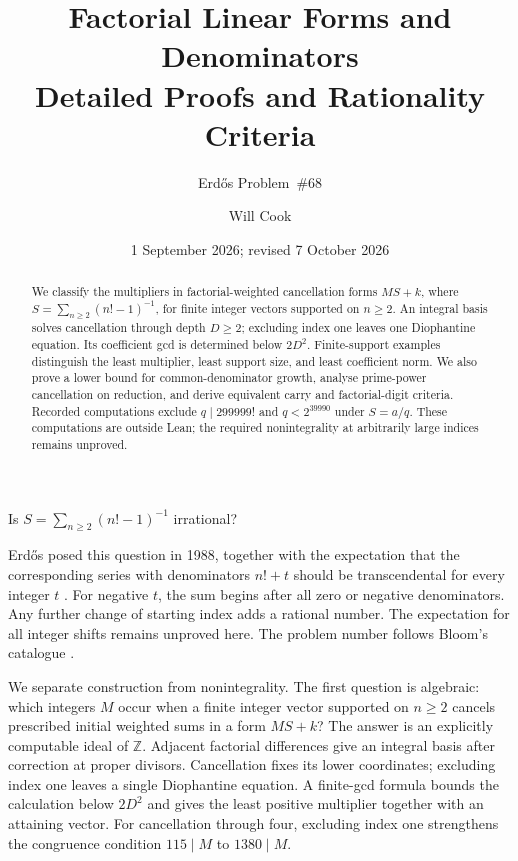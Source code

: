 \documentclass[11pt]{article}
\title{Factorial Linear Forms and Denominators\\Detailed Proofs and Rationality Criteria}
\subtitle{Erd\H{o}s Problem~\#68}
\author{Will Cook}
\date{1 September 2026; revised 7 October 2026}
\newcommand{\Ser}{S}
\begin{document}
\maketitle
\noteprovenance

\begin{abstract}
We classify the multipliers in factorial-weighted cancellation forms
$MS+k$, where $S=\sum_{n\ge2}(n!-1)^{-1}$, for finite integer vectors
supported on $n\ge2$. An integral basis solves cancellation through
depth $D\ge2$; excluding index one leaves one Diophantine equation.
Its coefficient gcd is determined below $2D^2$. Finite-support examples distinguish the least
multiplier, least support size, and least coefficient norm. We also prove a lower
bound for common-denominator growth, analyse prime-power cancellation
on reduction, and derive equivalent carry and factorial-digit criteria.
Recorded computations exclude $q\mid299999!$ and $q<2^{39990}$ under
$S=a/q$. These computations are outside Lean; the required nonintegrality
at arbitrarily large indices remains unproved.
\end{abstract}

\begin{problem}[Erd\H{o}s \#68]\label{long68:res:problem}
Is $\Ser=\sum_{n\ge2}(n!-1)^{-1}$ irrational?
\end{problem}

Erd\H{o}s posed this question in 1988, together with the expectation that
the corresponding series with denominators $n!+t$ should be
transcendental for every integer $t$ \cite[p.~102]{erdos1988}.
For negative $t$, the sum begins after all zero or negative denominators.
Any further change of starting index adds a rational number. The
expectation for all integer shifts remains unproved here.
The problem number follows Bloom's catalogue \cite{bloom}.

We separate construction from nonintegrality. The first question is
algebraic: which integers $M$ occur when a finite integer vector
supported on $n\ge2$ cancels prescribed initial weighted sums in a form
$MS+k$? The answer is an explicitly computable ideal of $\mathbb Z$.
Adjacent factorial differences give an integral basis after correction
at proper divisors. Cancellation fixes its lower coordinates;
excluding index one leaves a single Diophantine equation. A finite-gcd
formula bounds the calculation below $2D^2$ and gives the least
positive multiplier together with an attaining vector. For cancellation
through four, excluding index one strengthens the congruence condition
$115\mid M$ to $1380\mid M$.
\end{document}
